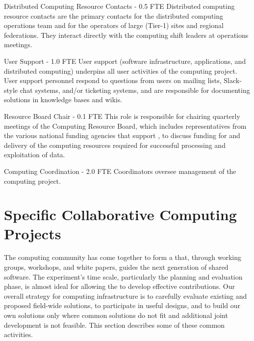 \begin{description}
\item {Distributed Computing Resource Contacts - 0.5 FTE}
Distributed computing resource contacts are the primary contacts for the  distributed computing operations team and for the operators of large (Tier-1) sites and regional federations. They interact directly with the computing shift leaders at operations meetings. %

\item {User Support - 1.0 FTE}
User support (software infrastructure, applications, and distributed computing) underpins all user activities of the  computing project. 
User support %
personnel %
respond to questions from users on mailing lists, Slack-style chat systems, and/or ticketing systems, %
and are responsible for documenting solutions in knowledge bases and wikis.%

\item {Resource Board Chair - 0.1 FTE}
This role is responsible for chairing quarterly meetings of the Computing Resource Board, which includes representatives from the %
various national funding agencies that support , to discuss %
funding for and delivery of the computing resources required for successful processing and exploitation of  data. %

\item {Computing Coordination - 2.0 FTE}
Coordinators oversee management of the computing project. 
\end{description}



\section{Specific Collaborative Computing Projects}
\label{ch:exec-comp-gov-coop}

The  computing community has come together to form a \cite{Alves:2017she} that, through working groups, workshops, and white papers, guides the next generation of shared  software.  %
The  experiment's time scale, particularly the planning and evaluation phase, is almost ideal for allowing the  to develop effective contributions. Our overall strategy for computing infrastructure is to carefully evaluate existing and proposed field-wide solutions, to participate in useful designs, and to build our own solutions only where common solutions do not fit and additional joint development is not feasible.   This section describes some of these common activities. 



